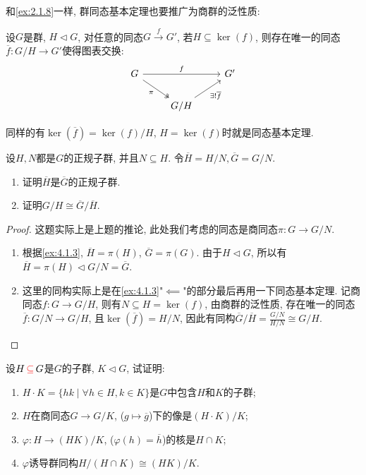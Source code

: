 \begin{remark}
    和\ref{ex:2.1.8}一样, 群同态基本定理也要推广为商群的泛性质:
    \begin{thmstar}
        设$G$是群, $H \lhd G$, 对任意的同态$G \stackrel{f}{\to} G'$, 若$H \subseteq \ker(f)$, 则存在唯一的同态$\overline{f}:G/H \to G'$使得图表交换:
        \[
            \begin{tikzcd}
                G \arrow[rr, "f"] \arrow[rd, "\pi"', two heads] &                                 & G' \\
                                                                & G/H \arrow[ru, "\exists!\overline{f}"'] &   
                \end{tikzcd}
        \]
    \end{thmstar}
    同样的有$\ker(\overline{f}) = \ker(f)/H$, $H = \ker(f)$时就是同态基本定理.
\end{remark}

\begin{problem}
    设$H, N$都是$G$的正规子群, 并且$N \subseteq H$. 令$\overline{H} = H/N, \overline{G} = G/N$.
    \begin{enumerate}[(1)]
        \item 证明$\overline{H}$是$\overline{G}$的正规子群.
        \item 证明$G/H \cong \overline{G}/\overline{H}$.
    \end{enumerate}
\end{problem}

\begin{proof}
    这题实际上是上题的推论, 此处我们考虑的同态是商同态$\pi:G \to G/N$.
    \begin{enumerate}[(1)]
        \item 根据\ref{ex:4.1.3}, $\overline{H} = \pi(H)$, $\overline{G} = \pi(G)$. 由于$H \lhd G$, 所以有$\overline{H} = \pi(H) \lhd G/N = \overline{G}$.
        \item 这里的同构实际上是在\ref{ex:4.1.3}"$\impliedby$"的部分最后再用一下同态基本定理. 记商同态$f:G \to G/H$, 则有$N \subseteq H = \ker(f)$, 由商群的泛性质, 存在唯一的同态$\overline{f}:G/N \to G/H$, 且$\ker(\overline{f}) = H/N$, 因此有同构$\overline{G}/\overline{H} = \frac{G/N}{H/N} \cong G/H$.
    \end{enumerate}
\end{proof}

\begin{problem}
    设$H \,\textcolor{red}{\subseteq}\, G$是$G$的子群, $K \lhd G$, 试证明: 
    \begin{enumerate}[(1)]
        \item $H \cdot K = \{hk \mid \forall h \in H, k \in K\}$是$G$中包含$H$和$K$的子群;
        \item $H$在商同态$G \to G/K$, ($g \mapsto \overline{g}$)下的像是$(H \cdot K)/K$;
        \item $\varphi:H \to (HK)/K$, ($\varphi(h) = \overline{h}$)的核是$H \cap K$;
        \item $\varphi$诱导群同构$H/(H \cap K) \cong (HK)/K$.
    \end{enumerate}
\end{problem}

